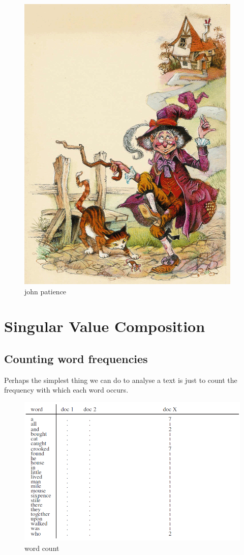 \documentclass[11pt]{article}
\begin{document}
\begin{figure}[H]
    \centering
    \includegraphics{../out/images/john_patience}
    \caption[john patience]{john patience}
    \label{fig:john patience}
\end{figure}

\section{Singular Value Composition}\label{sec:singular-value-composition}
\subsection{Counting word frequencies}\label{subsec:counting-word-frequencies}
Perhaps the simplest thing we can do to analyse a text is just to count the frequency with which each word occurs.

\begin{figure}[H]
    \centering
    \includegraphics{../out/images/word-count}
    \caption[word count]{word count}
    \label{fig:word count}
\end{figure}
\end{document}
